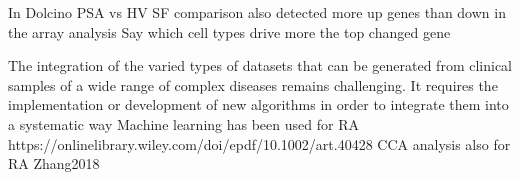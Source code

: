 In Dolcino PSA vs HV SF comparison also detected more up genes than down in the array analysis
Say which cell types drive more the top changed gene





The integration of the varied types of datasets that can be generated from clinical samples of a wide range of complex diseases remains challenging. It requires the implementation or development of new algorithms in order to integrate them into a systematic way
Machine learning has been used for RA https://onlinelibrary.wiley.com/doi/epdf/10.1002/art.40428
CCA analysis also for RA Zhang2018	





